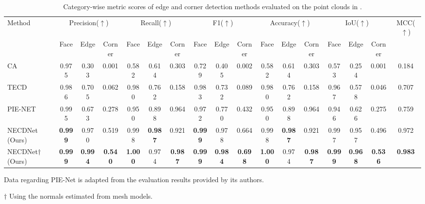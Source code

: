 \documentclass[lettersize,journal]{IEEEtran}
\begin{document}
\begin{table}[ht]
        \small
        \setlength{\tabcolsep}{2.6pt}
        \caption{Category-wise metric scores of edge and corner detection methods evaluated on the point clouds in .}
        \label{tab:metrics_result_of_four_obj}
        \begin{threeparttable}
            \begin{tabular}{lccc ccc ccc ccc ccc c}
            \toprule
            Method & \multicolumn{3}{c}{Precision($\uparrow$)} & \multicolumn{3}{c}{Recall($\uparrow$)} & \multicolumn{3}{c}{F1($\uparrow$)} & \multicolumn{3}{c}{Accuracy($\uparrow$)} & \multicolumn{3}{c}{IoU($\uparrow$)} & MCC($\uparrow$) \\
            \cmidrule(lr){2-4} \cmidrule(lr){5-7} \cmidrule(lr){8-10} \cmidrule(lr){11-13} \cmidrule(lr){14-16} 
             & Face & Edge & Corner & Face & Edge & Corner & Face & Edge & Corner & Face & Edge & Corner & Face & Edge & Corner &  \\
            \midrule
            CA~\cite{bazazian_fast_2015} & 0.975 & 0.303 & 0.001 & 0.582 & 0.614 & 0.303 & 0.729 & 0.405 & 0.002 & 0.582 & 0.614 & 0.303 & 0.573 & 0.254 & 0.001 & 0.184 \\
            TECD~\cite{ahmed_edge_2018} & 0.986 & 0.705 & 0.062 & 0.980 & 0.762 & 0.158 & 0.983 & 0.732 & 0.089 & 0.980 & 0.762 & 0.158 & 0.967 & 0.578 & 0.046 & 0.707 \\
            PIE-NET~\cite{wang_pienet_2020a} & 0.995 & 0.673 & 0.278 & 0.950 & 0.898 & 0.964 & 0.972 & 0.770 & 0.432 & 0.950 & 0.898 & 0.964 & 0.946 & 0.626 & 0.275 & 0.759 \\
            NECDNet (Ours) & \textbf{0.999}& 0.970 & 0.519 & 0.998 & \textbf{0.987}& 0.921 & \textbf{0.999}& 0.978 & 0.664 & 0.998 & \textbf{0.987}& 0.921 & 0.997 & 0.957 & 0.496 & 0.972 \\
            NECDNet$\dagger$ (Ours) & \textbf{0.999}& \textbf{0.994}& \textbf{0.540}& \textbf{1.000}& 0.974 & \textbf{0.987}& \textbf{0.999}& \textbf{0.984}& \textbf{0.698}& \textbf{1.000}& 0.974 & \textbf{0.987}& \textbf{0.999}& \textbf{0.968}& \textbf{0.536}& \textbf{0.983}\\
            \bottomrule
        \end{tabular}
        \begin{tablenotes}
            \footnotesize
             Data regarding PIE-Net is adapted from the evaluation results provided by its authors.
             
            $\dagger$ Using the normals estimated from mesh models. 
         \end{tablenotes}
        \end{threeparttable}
         
    \end{table}
\end{document}
